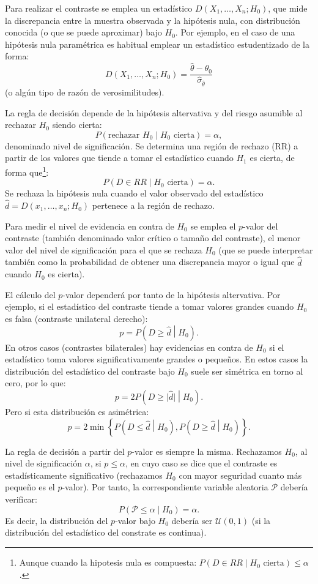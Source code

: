 \documentclass[
]{book}
\theoremstyle{break}
\theoremstyle{definition}
\theoremstyle{definition}
\theoremstyle{definition}
\theoremstyle{remark}
\begin{document}
Para realizar el contraste se emplea un estadístico \(D\left( X_1,\ldots ,X_n;H_0\right)\),
que mide la discrepancia entre la muestra observada y la hipótesis nula,
con distribución conocida (o que se puede aproximar) bajo \(H_0\).
Por ejemplo, en el caso de una hipótesis nula paramétrica
es habitual emplear un estadístico estudentizado de la forma:
\[D\left( X_1,\ldots ,X_n;H_0\right) =
\frac{\hat{\theta}-\theta _0}{\hat\sigma_{\hat\theta}}\]
(o algún tipo de razón de verosimilitudes).

La regla de decisión depende de la hipótesis altervativa y
del riesgo asumible al rechazar \(H_0\) siendo cierta:
\[P\left( \text{rechazar }H_0\mid H_0\text{ cierta}\right) =\alpha,\]
denominado nivel de significación.
Se determina una región de rechazo (RR) a partir de los valores que tiende
a tomar el estadístico cuando \(H_1\) es cierta,
de forma que\footnote{Aunque cuando la hipotesis nula es compuesta:
  \(P\left( D\in RR \mid H_0\text{ cierta}\right) \leq \alpha\).}:
\[P\left( D\in RR \mid H_0\text{ cierta}\right) =\alpha.\]
Se rechaza la hipótesis nula cuando el valor observado del
estadístico \(\hat{d}=D\left( x_1,\ldots ,x_n;H_0\right)\) pertenece
a la región de rechazo.

Para medir el nivel de evidencia en contra de \(H_0\) se emplea el
\(p\)-valor del contraste (también denominado valor crítico o
tamaño del contraste), el menor valor del nivel
de significación para el que se rechaza \(H_0\)
(que se puede interpretar también como la
probabilidad de obtener una discrepancia mayor o igual que
\(\hat{d}\) cuando \(H_0\) es cierta).

El cálculo del \(p\)-valor dependerá por tanto de la hipótesis altervativa.
Por ejemplo, si el estadístico del contraste tiende a tomar valores
grandes cuando \(H_0\) es falsa (contraste unilateral derecho):
\[p = P\left( D \geq \hat{d} \middle| H_0\right).\]
En otros casos (contrastes bilaterales) hay evidencias en contra de
\(H_0\) si el estadístico toma valores significativamente grandes o pequeños.
En estos casos la distribución del estadístico del contraste bajo \(H_0\)
suele ser simétrica en torno al cero, por lo que:
\[p = 2P\left( D \geq \vert \hat{d} \vert \middle| H_0 \right).\]
Pero si esta distribución es asimétrica:
\[p = 2 \min \left\{ P\left( D \leq \hat{d} \middle| H_0 \right),
P\left( D \geq \hat{d} \middle| H_0\right) \right\}.\]

La regla de decisión a partir del \(p\)-valor es siempre la misma.
Rechazamos \(H_0\), al nivel de significación \(\alpha\), si \(p \leq \alpha\),
en cuyo caso se dice que el contraste es estadísticamente significativo
(rechazamos \(H_0\) con mayor seguridad cuanto más pequeño es el \(p\)-valor).
Por tanto, la correspondiente variable aleatoria \(\mathcal{P}\) debería verificar:
\[P\left( \mathcal{P} \leq \alpha \middle| H_0\right)= \alpha.\]
Es decir, la distribución del \(p\)-valor bajo \(H_0\) debería ser \(\mathcal{U}(0,1)\)
(si la distribución del estadístico del constrate es continua).
\end{document}
